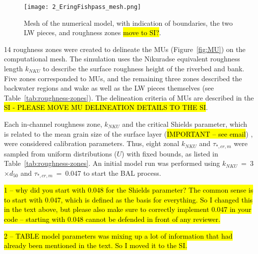 \documentclass[draft,linenumbers,onecolumn]{agujournal2019} %
\begin{document}
\begin{figure}[!htbp]
	\centering
	\texttt{[image: 2\_EringFishpass\_mesh.png]}
	\caption{Mesh of the numerical model, with indication of boundaries, the two LW pieces, and roughness zones \hl{move to SI?}.}
	\label{fig:mesh}
\end{figure}


14 roughness zones were created to delineate the MUs (Figure~\ref{fig:MU}) on the computational mesh. The simulation uses the Nikuradse equivalent roughness length $k_{NKU}$  \cite{nikuradse1933stroemungsgesetze} to describe the surface roughness height of the riverbed and bank. Five zones corresponded to MUs, and the remaining three zones described the backwater regions and wake as well as the LW pieces themselves (see Table~\ref{tab:roughness-zones}). The delineation criteria of MUs are described in the \hl{SI - PLEASE MOVE MU DELINEATION DETAILS TO THE SI}.


Each in-channel roughness zone, $k_{NKU}$ and the critical Shields parameter, which is related to the mean grain size of the surface layer (\hl{IMPORTANT -- see email}) , were considered calibration parameters. Thus, eight zonal $k_{NKU}$  and $\tau_{*,cr,m}$  were sampled from uniform distributions ($U$) with fixed bounds, as listed in Table~\ref{tab:roughness-zones}. An initial model run was performed using $k_{NKU}$~=~3$\times d_{50}$ and $\tau_{*,cr,m}$~=~0.047 to start the BAL process. 

\hl{1 -- why did you start with 0.048 for the Shields parameter? The common sense is to start with 0.047, which is defined as the basis for everything. So I changed this in  the text above, but please also make sure to correctly implement 0.047 in your code -- starting with 0.048 cannot be defended in front of any reviewer.}

\hl{2 -- TABLE model parameters was mixing up a lot of information that had already been mentioned in the text. So I moved it to the SI.}
\end{document}
